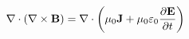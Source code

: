 \documentclass[preview]{standalone}
\begin{document}
\begin{align*}
\nabla \cdot \left(\nabla \times \mathbf{B}\right) = \nabla \cdot \left(\mu_{0}\mathbf{J} + \mu_{0}\varepsilon_{0} \pdv{\mathbf{E}}{t} \right)
\end{align*}
\end{document}
